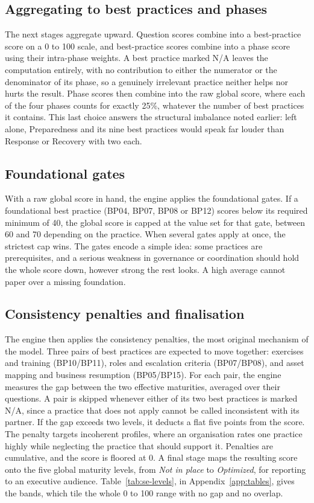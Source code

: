 \subsection{Aggregating to best practices and phases}

The next stages aggregate upward. Question scores combine into a best-practice score
on a 0 to 100 scale, and best-practice scores combine into a phase score using their
intra-phase weights. A best practice marked N/A leaves the computation entirely,
with no contribution to either the numerator or the denominator of its phase, so a
genuinely irrelevant practice neither helps nor hurts the result. Phase scores then
combine into the raw global score, where each of the four phases counts for exactly
25\%, whatever the number of best practices it contains. This last choice answers
the structural imbalance noted earlier: left alone, Preparedness and its nine best
practices would speak far louder than Response or Recovery with two each.

\subsection{Foundational gates}

With a raw global score in hand, the engine applies the foundational gates. If a
foundational best practice (BP04, BP07, BP08 or BP12) scores below its required
minimum of 40, the global score is capped at the value set for that gate, between 60
and 70 depending on the practice. When several gates apply at once, the strictest
cap wins. The gates encode a simple idea: some practices are prerequisites, and a
serious weakness in governance or coordination should hold the whole score down,
however strong the rest looks. A high average cannot paper over a missing
foundation.

\subsection{Consistency penalties and finalisation}

The engine then applies the consistency penalties, the most original mechanism of
the model. Three pairs of best practices are expected to move together: exercises
and training (BP10/BP11), roles and escalation criteria (BP07/BP08), and asset
mapping and business resumption (BP05/BP15). For each pair, the engine measures the
gap between the two effective maturities, averaged over their questions. A pair is
skipped whenever either of its two best practices is marked N/A, since a practice
that does not apply cannot be called inconsistent with its partner. If the gap
exceeds two levels, it deducts a flat five points from the score. The penalty
targets incoherent profiles, where an organisation rates one practice highly while
neglecting the practice that should support it. Penalties are cumulative, and the
score is floored at 0. A final stage maps the resulting score onto the five global
maturity levels, from \emph{Not in place} to \emph{Optimized}, for reporting to an
executive audience. Table~\ref{tab:se-levels}, in Appendix~\ref{app:tables}, gives the bands, which tile the whole
0 to 100 range with no gap and no overlap.




